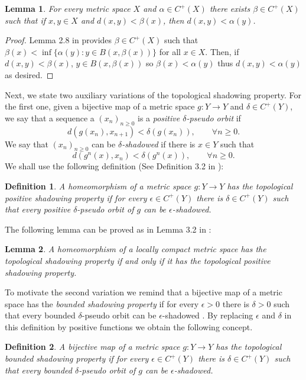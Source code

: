 \documentclass[11pt,letterpaper]{amsart}
\newtheorem{lem}{Lemma}
\newtheorem{definition}{Definition}
\numberwithin{equation}{section}
\begin{document}
\begin{lem}
\label{landru}
For every metric space $X$ and $\alpha\in C^+(X)$ there exists
$\beta\in C^+(X)$ such that
if $x,y\in X$ and $d(x,y)< \beta(x)$, then $d(x,y)< \alpha(y)$.
\end{lem}

\begin{proof}
Lemma 2.8 in \cite{lny} provides $\beta\in C^+(X)$ such that
$\beta(x)<\inf\{\alpha(y):y\in B(x,\beta(x))\}$ for all $x\in X$.
Then, if $d(x,y)<\beta(x)$, $y\in B(x,\beta(x))$ so $\beta(x)<\alpha(y)$ thus
$d(x,y)<\alpha(y)$ as desired.
\end{proof}


Next, we state two auxiliary variations of the topological shadowing property.
For the first one, given a bijective map of a metric space $g:Y\to Y$ and $\delta\in C^+(Y)$, 
we say that a sequence a $(x_n)_{n\geq0}$ is a {\em positive $\delta$-pseudo orbit} if
$$
d(g(x_n),x_{n+1})< \delta(g(x_n)),\quad\quad\forall n\geq0.
$$
We say that $(x_n)_{n\geq0}$ can be {\em $\delta$-shadowed} if there is $x\in Y$ such that
$$
d(g^n(x),x_n)<\delta(g^n(x)),\quad\quad\forall n\geq0.
$$
We shall use the following definition (See Definition 3.2 in \cite{c}):

\begin{definition}
A homeomorphism of a metric space $g:Y\to Y$ has the {\em topological positive shadowing property} if for every $\epsilon\in C^+(Y)$ there is $\delta\in C^+(Y)$ such that every positive $\delta$-pseudo orbit of $g$ can be $\epsilon$-shadowed.
\end{definition}

The following lemma can be proved as in Lemma 3.2 in \cite{c}:

\begin{lem}
\label{preparada}
A homeomorphism of a locally compact metric space has the topological shadowing property if and only if it has the topological positive shadowing property.
\end{lem}

To motivate the second variation we remind that a bijective map of a metric space has the {\em bounded shadowing property} if for every $\epsilon>0$ there is $\delta>0$ such that every bounded $\delta$-pseudo orbit can be $\epsilon$-shadowed \cite{lm}.
By replacing $\epsilon$ and $\delta$ in this definition by positive functions we obtain the following concept.

\begin{definition}
A bijective map of a metric space $g:Y\to Y$ has the {\em topological bounded shadowing property}
if for every $\epsilon\in C^+(Y)$ there is $\delta\in C^+(Y)$ such that
every {\em bounded} $\delta$-pseudo orbit of $g$ can be $\epsilon$-shadowed.
\end{definition}
\end{document}
